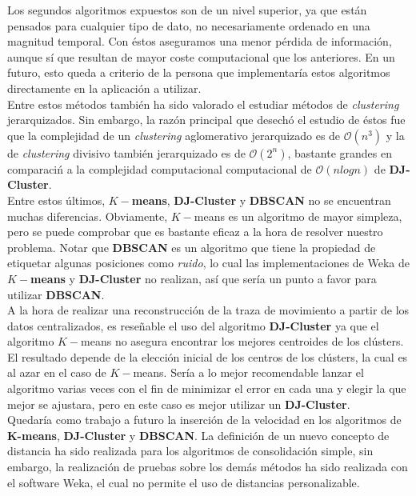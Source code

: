 \documentclass[a4paper, 12pt]{article}
\begin{document}
Los segundos algoritmos expuestos son de un nivel superior, ya que est\'an pensados para cualquier tipo de dato, no necesariamente ordenado en una magnitud temporal. Con \'estos aseguramos una menor p\'erdida de informaci\'on, aunque s\'i que resultan de mayor coste computacional que los anteriores. En un futuro, esto queda a criterio de la persona que implementar\'ia estos algoritmos directamente en la aplicaci\'on a utilizar. \\

Entre estos m\'etodos tambi\'en ha sido valorado el estudiar m\'etodos de \textit{clustering} jerarquizados. Sin embargo, la raz\'on principal que desech\'o el estudio de \'estos fue que la complejidad de un \textit{clustering} aglomerativo jerarquizado es de $\mathcal{O}(n^3)$ y la de \textit{clustering} divisivo tambi\'en jerarquizado es de $\mathcal{O}(2^n)$, bastante grandes en comparaci\'n a la complejidad computacional computacional de $\mathcal{O}(n log n)$ de \textbf{DJ-Cluster}.\\

Entre estos \'ultimos, \textbf{$K-$means}, \textbf{DJ-Cluster} y \textbf{DBSCAN} no se encuentran muchas diferencias. Obviamente, $K-$means es un algoritmo de mayor simpleza, pero se puede comprobar que es bastante eficaz a la hora de resolver nuestro problema. Notar que \textbf{DBSCAN} es un algoritmo que tiene la propiedad de etiquetar algunas posiciones como \textit{ruido}, lo cual las implementaciones de Weka de \textbf{$K-$means} y \textbf{DJ-Cluster} no realizan, as\'i que ser\'ia un punto a favor para utilizar \textbf{DBSCAN}.\\

A la hora de realizar una reconstrucci\'on de la traza de movimiento a partir de los datos centralizados, es rese\~nable el uso del algoritmo \textbf{DJ-Cluster} ya que el algoritmo $K-$means no asegura encontrar los mejores centroides de los cl\'usters. El resultado depende de la elecci\'on inicial de los centros de los cl\'usters, la cual es al azar en el caso de $K-$means. Ser\'ia a lo mejor recomendable lanzar el algoritmo varias veces con el fin de minimizar el error en cada una y elegir la que mejor se ajustara, pero en este caso es mejor utilizar un \textbf{DJ-Cluster}. \\

Quedar\'ia como trabajo a futuro la inserci\'on de la velocidad en los algoritmos de \textbf{K-means}, \textbf{DJ-Cluster} y \textbf{DBSCAN}. La definici\'on de un nuevo concepto de distancia ha sido realizada para los algoritmos de consolidaci\'on simple, sin embargo, la realizaci\'on de pruebas sobre los dem\'as m\'etodos ha sido realizada con el software Weka, el cual no permite el uso de distancias personalizable. \\
\end{document}
